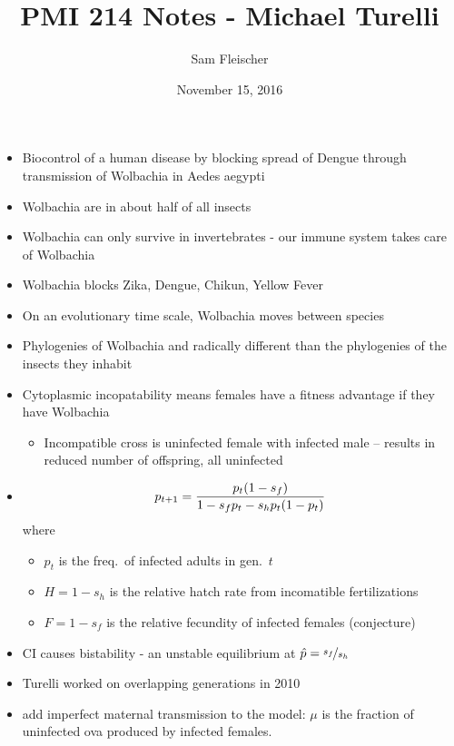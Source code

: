 \documentclass{article}
\title{PMI 214 Notes - Michael Turelli}
\author{Sam Fleischer}
\date{November 15, 2016}
\begin{document}
    \maketitle

    \begin{itemize}
        \item Biocontrol of a human disease by blocking spread of Dengue through transmission of Wolbachia in Aedes aegypti
        \item Wolbachia are in about half of all insects
        \item Wolbachia can only survive in invertebrates - our immune system takes care of Wolbachia
        \item Wolbachia blocks Zika, Dengue, Chikun, Yellow Fever
        \item On an evolutionary time scale, Wolbachia moves between species
        \item Phylogenies of Wolbachia and radically different than the phylogenies of the insects they inhabit
        \item Cytoplasmic incopatability means females have a fitness advantage if they have Wolbachia
        \begin{itemize}
            \item Incompatible cross is uninfected female with infected male -- results in reduced number of offspring, all uninfected
        \end{itemize}
        \item \begin{align*}
            p_{t+1} = \frac{p_t\qty(1 - s_f)}{1 - s_fp_t - s_hp_t\qty(1 - p_t)}
        \end{align*}
        where
        \begin{itemize}
            \item $p_t$ is the freq.~of infected adults in gen.~$t$
            \item $H = 1 - s_h$ is the relative hatch rate from incomatible fertilizations
            \item $F = 1 - s_f$ is the relative fecundity of infected females (conjecture)
        \end{itemize}
        \item CI causes bistability - an unstable equilibrium at $\hat{p} = \nicefrac{s_f}{s_h}$
        \item Turelli worked on overlapping generations in 2010
        \item add imperfect maternal transmission to the model: $\mu$ is the fraction of uninfected ova produced by infected females.

\end{itemize}
\end{document}
